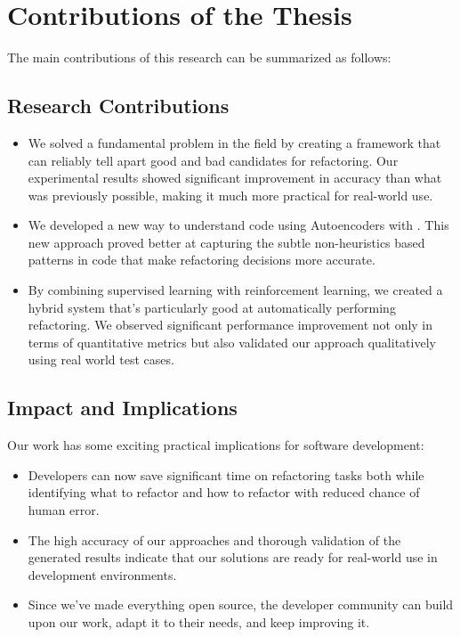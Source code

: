 \section{Contributions of the Thesis}

The main contributions of this research can be summarized as follows:

\subsection{Research Contributions}

\begin{itemize}

\item We solved a fundamental problem in the field by creating a framework that can reliably tell apart good and bad candidates for \exm{} refactoring. Our experimental results showed significant improvement in accuracy than what was previously possible, making it much more practical for real-world use.

\item We developed a new way to understand code using Autoencoders with \GCB{}. This new approach proved better at capturing the subtle non-heuristics based patterns in code that make refactoring decisions more accurate.

\item By combining supervised learning with reinforcement learning, we created a hybrid system that's particularly good at automatically performing \exm{} refactoring. We observed significant performance improvement not only in terms of quantitative metrics but also validated our approach qualitatively using real world test cases. 


\end{itemize}

\subsection{Impact and Implications}
Our work has some exciting practical implications for software development:

\begin{itemize}
\item Developers can now save significant time on refactoring tasks both while identifying what to refactor and how to refactor with reduced chance of human error.

\item The high accuracy of our approaches and thorough validation of the generated results indicate that our solutions are ready for real-world use in development environments.

\item Since we've made everything open source, the developer community can build upon our work, adapt it to their needs, and keep improving it.

\end{itemize}

